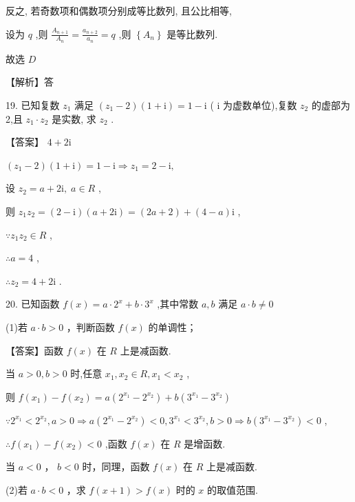\documentclass[10pt]{article}
\begin{document}
反之, 若奇数项和偶数项分别成等比数列, 且公比相等,

设为 \(q\) ,则 \(\frac{{A}_{n + 1}}{{A}_{n}} = \frac{{a}_{n + 2}}{{a}_{n}} = q\) ,则 \(\left\{  {A}_{n}\right\}\) 是等比数列.

故选 \(D\)

【解析】答

19. 已知复数 \({z}_{1}\) 满足 \(\left( {{z}_{1} - 2}\right) \left( {1 + \mathrm{i}}\right)  = 1 - \mathrm{i}\) ( \(\mathrm{i}\) 为虚数单位),复数 \({z}_{2}\) 的虚部为 2,且 \({z}_{1} \cdot  {z}_{2}\) 是实数, 求 \({z}_{2}\) .

【答案】 \(4 + 2\mathrm{i}\)

\(\left( {{z}_{1} - 2}\right) \left( {1 + \mathrm{i}}\right)  = 1 - \mathrm{i} \Rightarrow  {z}_{1} = 2 - \mathrm{i},\)

设 \({z}_{2} = a + 2\mathrm{i},\;a \in  R\) ,

则 \({z}_{1}{z}_{2} = \left( {2 - \mathrm{i}}\right) \left( {a + 2\mathrm{i}}\right)  = \left( {{2a} + 2}\right)  + \left( {4 - a}\right) \mathrm{i}\) ,

\(\because {z}_{1}{z}_{2} \in  R\) ,

\(\therefore a = 4\) ,

\(\therefore {z}_{2} = 4 + 2\mathrm{i}\) .

20. 已知函数 \(f\left( x\right)  = a \cdot  {2}^{x} + b \cdot  {3}^{x}\) ,其中常数 \(a,b\) 满足 \(a \cdot  b \neq  0\)

(1)若 \(a \cdot  b > 0\) ，判断函数 \(f\left( x\right)\) 的单调性；

【答案】函数 \(f\left( x\right)\) 在 \(R\) 上是减函数.

当 \(a > 0,b > 0\) 时,任意 \({x}_{1},{x}_{2} \in  R,{x}_{1} < {x}_{2}\) ,

则 \(f\left( {x}_{1}\right)  - f\left( {x}_{2}\right)  = a\left( {{2}^{{x}_{1}} - {2}^{{x}_{2}}}\right)  + b\left( {{3}^{{x}_{1}} - {3}^{{x}_{2}}}\right)\)

\(\because {2}^{{x}_{1}} < {2}^{{x}_{2}},a > 0 \Rightarrow  a\left( {{2}^{{x}_{1}} - {2}^{{x}_{2}}}\right)  < 0,{3}^{{x}_{1}} < {3}^{{x}_{2}},b > 0 \Rightarrow  b\left( {{3}^{{x}_{1}} - {3}^{{x}_{2}}}\right)  < 0\) ,

\(\therefore f\left( {x}_{1}\right)  - f\left( {x}_{2}\right)  < 0\) ,函数 \(f\left( x\right)\) 在 \(R\) 是增函数.

当 \(a < 0\) ， \(b < 0\) 时，同理，函数 \(f\left( x\right)\) 在 \(R\) 上是减函数.

(2)若 \(a \cdot  b < 0\) ，求 \(f\left( {x + 1}\right)  > f\left( x\right)\) 时的 \(x\) 的取值范围.
\end{document}

